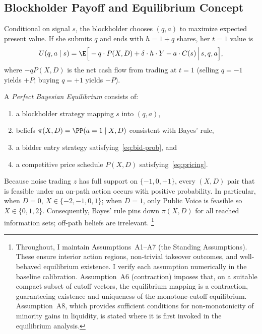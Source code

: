 \subsection{Blockholder Payoff and Equilibrium Concept}

Conditional on signal $s$, the blockholder chooses $(q, a)$ to maximize expected present value. If she submits $q$ and ends with $h = 1 + q$ shares, her $t = 1$ value is
\[
U(q, a \mid s) = \E\Big[-q \cdot P(X,D) + \delta \cdot h \cdot Y - a \cdot C(s) \,\Big|\, s, q, a\Big],
\]
where $-qP(X,D)$ is the net cash flow from trading at $t = 1$ (selling $q = -1$ yields $+P$; buying $q = +1$ yields $-P$).

\begin{definition}
A \emph{Perfect Bayesian Equilibrium} consists of:
\begin{enumerate}[label=(\roman{enumi})]
\item a blockholder strategy mapping $s$ into $(q, a)$,
\item beliefs $\pi(X,D) = \PP(a = 1 \mid X, D)$ consistent with Bayes' rule,
\item a bidder entry strategy satisfying~\eqref{eq:bid-prob}, and
\item a competitive price schedule $P(X,D)$ satisfying~\eqref{eq:pricing}.
\end{enumerate}
\end{definition}

Because noise trading $z$ has full support on $\{-1,0,+1\}$, every $(X,D)$ pair that is feasible under an on-path action occurs with positive probability. In particular, when $D=0$, $X\in\{-2,-1,0,1\}$; when $D=1$, only Public Voice is feasible so $X\in\{0,1,2\}$. Consequently, Bayes' rule pins down $\pi(X,D)$ for all reached information sets; off-path beliefs are irrelevant.%
\footnote{Throughout, I maintain Assumptions~A1--A7 (the Standing Assumptions). These ensure interior action regions, non-trivial takeover outcomes, and well-behaved equilibrium existence. I verify each assumption numerically in the baseline calibration. Assumption~A6 (contraction) imposes that, on a suitable compact subset of cutoff vectors, the equilibrium mapping is a contraction, guaranteeing existence and uniqueness of the monotone-cutoff equilibrium. Assumption~A8, which provides sufficient conditions for non-monotonicity of minority gains in liquidity, is stated where it is first invoked in the equilibrium analysis.}
